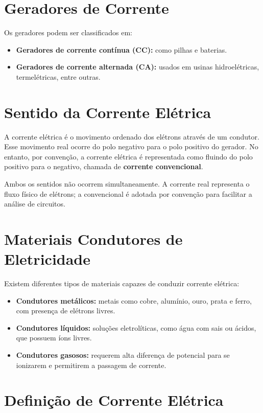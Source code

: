 \section{Geradores de Corrente}

Os geradores podem ser classificados em:

\begin{itemize}
    \item \textbf{Geradores de corrente contínua (CC):} como pilhas e baterias.
    \item \textbf{Geradores de corrente alternada (CA):} usados em usinas hidroelétricas, termelétricas, entre outras.
\end{itemize}

\section{Sentido da Corrente Elétrica}

A corrente elétrica é o movimento ordenado dos elétrons através de um condutor. Esse movimento real ocorre do polo negativo para o polo positivo do gerador. No entanto, por convenção, a corrente elétrica é representada como fluindo do polo positivo para o negativo, chamada de \textbf{corrente convencional}.

Ambos os sentidos não ocorrem simultaneamente. A corrente real representa o fluxo físico de elétrons; a convencional é adotada por convenção para facilitar a análise de circuitos.

\section{Materiais Condutores de Eletricidade}

Existem diferentes tipos de materiais capazes de conduzir corrente elétrica:

\begin{itemize}
    \item \textbf{Condutores metálicos:} metais como cobre, alumínio, ouro, prata e ferro, com presença de elétrons livres.
    \item \textbf{Condutores líquidos:} soluções eletrolíticas, como água com sais ou ácidos, que possuem íons livres.
    \item \textbf{Condutores gasosos:} requerem alta diferença de potencial para se ionizarem e permitirem a passagem de corrente.
\end{itemize}

\section{Definição de Corrente Elétrica}

